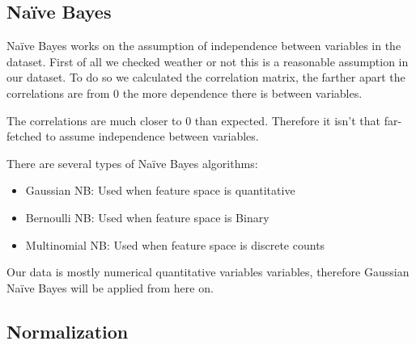 
\subsection{Na\"ive Bayes}%
\label{sub:naive-bayes}

\newcommand{\sresults}[2]{
\begin{table}[H]
\centering
\begin{tabular}{lc}
Confusion matrix on test set: & \( \begin{bmatrix} #1 \end{bmatrix} \) \\
    \addlinespace[0.5em]
    Accuracy on test set: & #2
\end{tabular}
\end{table}
}


Na\"ive Bayes works on the assumption of independence between variables in the dataset. First of all we checked weather or not this is a reasonable assumption in our dataset. To do so we calculated the correlation matrix, the farther apart the correlations are from 0 the more dependence there is between variables.


The correlations are much closer to 0 than expected. Therefore it isn't that far-fetched to assume independence
between variables.

There are several types of Na\"ive Bayes algorithms:
\begin{itemize}[topsep=0pt]
    \item Gaussian NB: Used when feature space is quantitative
    \item Bernoulli NB: Used when feature space is Binary
    \item Multinomial NB: Used when feature space is discrete counts
\end{itemize}

Our data is mostly numerical quantitative variables variables, therefore Gaussian Na\"ive Bayes will be applied from here on.

\subsection{Normalization}

